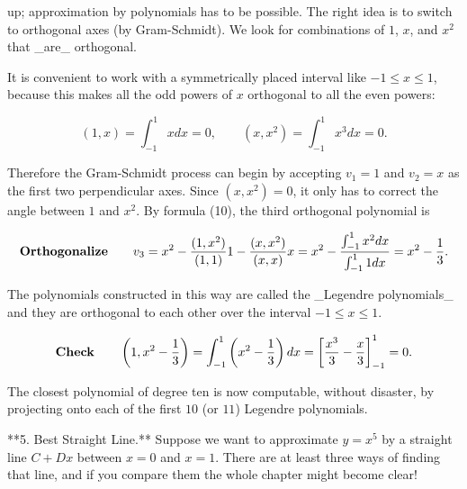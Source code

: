 up; approximation by polynomials has to be possible. The right idea is to switch to orthogonal axes (by Gram-Schmidt). We look for combinations of \(1\), \(x\), and \(x^{2}\) that _are_ orthogonal.

It is convenient to work with a symmetrically placed interval like \(-1\leq x\leq 1\), because this makes all the odd powers of \(x\) orthogonal to all the even powers:

\[(1,x)=\int_{-1}^{1}xdx=0,\qquad(x,x^{2})=\int_{-1}^{1}x^{3}dx=0.\]

Therefore the Gram-Schmidt process can begin by accepting \(v_{1}=1\) and \(v_{2}=x\) as the first two perpendicular axes. Since \((x,x^{2})=0\), it only has to correct the angle between \(1\) and \(x^{2}\). By formula (10), the third orthogonal polynomial is

\[\mbox{\bf Orthogonalize}\qquad v_{3}=x^{2}-\frac{(1,x^{2})}{(1,1)}1-\frac{(x,x ^{2})}{(x,x)}x=x^{2}-\frac{\int_{-1}^{1}x^{2}dx}{\int_{-1}^{1}1dx}=x^{2}-\frac {1}{3}.\]

The polynomials constructed in this way are called the _Legendre polynomials_ and they are orthogonal to each other over the interval \(-1\leq x\leq 1\).

\[\mbox{\bf Check}\qquad\left(1,x^{2}-\frac{1}{3}\right)=\int_{-1}^{1}\left(x^{2 }-\frac{1}{3}\right)dx=\left[\frac{x^{3}}{3}-\frac{x}{3}\right]_{-1}^{1}=0.\]

The closest polynomial of degree ten is now computable, without disaster, by projecting onto each of the first \(10\) (or \(11\)) Legendre polynomials.

**5. Best Straight Line.** Suppose we want to approximate \(y=x^{5}\) by a straight line \(C+Dx\) between \(x=0\) and \(x=1\). There are at least three ways of finding that line, and if you compare them the whole chapter might become clear!

